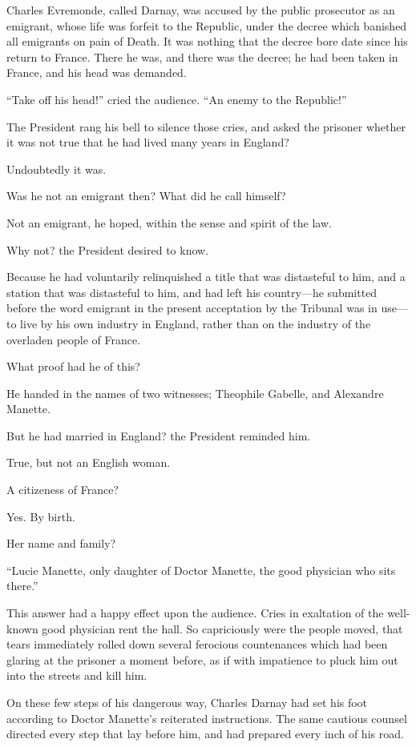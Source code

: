 Charles Evremonde, called Darnay, was accused by the public
prosecutor as an emigrant, whose life was forfeit to the Republic,
under the decree which banished all emigrants on pain of Death.
It was nothing that the decree bore date since his return to France.
There he was, and there was the decree; he had been taken in France,
and his head was demanded.

``Take off his head!'' cried the audience.  ``An enemy to the Republic!''

The President rang his bell to silence those cries, and asked the
prisoner whether it was not true that he had lived many years in England?

Undoubtedly it was.

Was he not an emigrant then?  What did he call himself?

Not an emigrant, he hoped, within the sense and spirit of the law.

Why not?  the President desired to know.

Because he had voluntarily relinquished a title that was distasteful
to him, and a station that was distasteful to him, and had left his
country---he submitted before the word emigrant in the present
acceptation by the Tribunal was in use---to live by his own industry
in England, rather than on the industry of the overladen people of
France.

What proof had he of this?

He handed in the names of two witnesses; Theophile Gabelle, and
Alexandre Manette.

But he had married in England?  the President reminded him.

True, but not an English woman.

A citizeness of France?

Yes.  By birth.

Her name and family?

``Lucie Manette, only daughter of Doctor Manette, the good physician
who sits there.''

This answer had a happy effect upon the audience.  Cries in
exaltation of the well-known good physician rent the hall.  So
capriciously were the people moved, that tears immediately rolled
down several ferocious countenances which had been glaring at the
prisoner a moment before, as if with impatience to pluck him out into
the streets and kill him.

On these few steps of his dangerous way, Charles Darnay had set his
foot according to Doctor Manette's reiterated instructions.  The same
cautious counsel directed every step that lay before him, and had
prepared every inch of his road.

